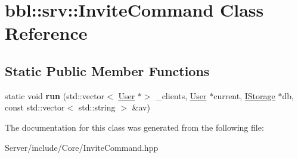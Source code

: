 \hypertarget{classbbl_1_1srv_1_1_invite_command}{}\section{bbl\+:\+:srv\+:\+:Invite\+Command Class Reference}
\label{classbbl_1_1srv_1_1_invite_command}
\subsection*{Static Public Member Functions}
\begin{DoxyCompactItemize}
\item 
\mbox{\label{classbbl_1_1srv_1_1_invite_command_a85c970e6e41c2f41d9ecad263a98dcbe}} 
static void {\bfseries run} (std\+::vector$<$ \hyperlink{classbbl_1_1srv_1_1_user}{User} $\ast$$>$ \+\_\+clients, \hyperlink{classbbl_1_1srv_1_1_user}{User} $\ast$current, \hyperlink{classbbl_1_1srv_1_1_i_storage}{I\+Storage} $\ast$db, const std\+::vector$<$ std\+::string $>$ \&av)
\end{DoxyCompactItemize}


The documentation for this class was generated from the following file\+:\begin{DoxyCompactItemize}
\item 
Server/include/\+Core/Invite\+Command.\+hpp\end{DoxyCompactItemize}

